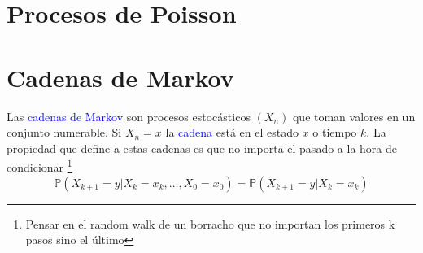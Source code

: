 \documentclass[11pt]{article}
\theoremstyle{plain} %
\theoremstyle{definition}
\theoremstyle{remark}
\def\P{\mathbb{P}}
\def\blue{\textcolor{blue}}
\begin{document}
\bigskip
\section{Procesos de Poisson}



\bigskip
\section{Cadenas de Markov}

Las \blue{cadenas de Markov} son procesos estocásticos $(X_n)$ que toman valores en un conjunto numerable. Si $X_n = x$ la \blue{cadena} está en el estado $x$ o tiempo $k$. La propiedad que define a estas cadenas es que no importa el pasado a la hora de condicionar \footnote{Pensar en el random walk de un borracho que no importan los primeros k pasos sino el último}
\[ \P\left( X_{k+1}=y | X_{k}=x_k , \dots , X_0 = x_0  \right) = \P \left( X_{k+1}=y |  X_{k}=x_k \right)  \] 
\end{document}
